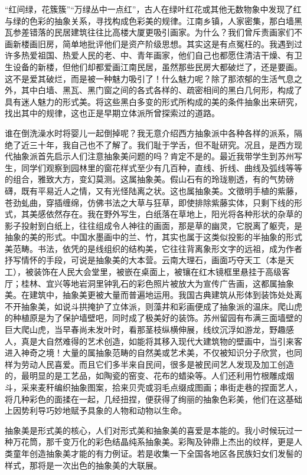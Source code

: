 \documentclass{article}
\begin{document}
“红间绿，花簇簇”“万绿丛中一点红”，古人在绿叶红花或其他无数物象中发现了红与绿的色彩的抽象关系，寻找构成色彩美的规律。江南乡镇，人家密集，那白墙黑瓦参差错落的民居建筑往往比高楼大厦更吸引画家。为什么？我们曾斥责画家们不画新楼画旧房，简单地批评他们是资产阶级思想。其实这是有点冤枉的。我遇到过许多热爱祖国、热爱人民的老、中、青年画家，他们自己也都愿住清洁干燥、有卫生设备的新楼，但他们却都爱画江南民居，虽然那些民房大都破烂了，还是要画。这不是爱其破烂，而是被一种魅力吸引了！什么魅力呢？除了那浓郁的生活气息之外，其中白墙、黑瓦、黑门窗之间的各式各样的、疏密相间的黑白几何形，构成了具有迷人魅力的形式美。将这些黑白多变的形式所构成的美的条件抽象出来研究，找出其中的规律，这也正是早期立体派所曾探索过的道路。

谁在倒洗澡水时将婴儿一起倒掉呢？我无意介绍西方抽象派中各种各样的派系，隔绝了近三十年，我自己也不了解了。我们耻于学舌，但不耻研究。况且，是西方现代抽象派首先启示人们注意抽象美问题的吗？肯定不是的。最近我带学生到苏州写生，同学们观察到园林里的窗花样式至少有几百种，直线、折线、曲线及弧线等等的组合，雅致大方，变幻莫测。这属抽象美。假山石有的玲珑剔透，有的气势磅礴，既有平易近人之情，又有光怪陆离之状。这也属抽象美。文徵明手植的紫藤，苍劲虬曲，穿插缠绵，仿佛书法之大草与狂草，即使排除紫藤实体，只剩下线的形式，其美感依然存在。我在野外写生，白纸落在草地上，阳光将各种形状的杂草的影子投射到白纸上，往往组成令人神往的画面，那是草的幽灵，它脱离了躯壳，是抽象的美的形式。中国水墨画中的兰、竹，其实也属于这类似投影的半抽象的形式美范畴。书法，依凭的是线组织的结构美，它往往背离象形文字的远祖，成为作者抒写情怀的手段，可说是抽象美的大本营。云南大理石，画面巧夺天工（本是天工），被装饰在人民大会堂里，被嵌在桌面上，被镶在红木镜框里悬挂于高级客厅；桂林、宜兴等地岩洞里钟乳石的彩色照片被放大为宣传广告画，这都属抽象美。在建筑中，抽象美更被大量而普遍地运用。我国古典建筑从形体到装饰处处离不开抽象美，如说斗拱掩护了立体派，则藻井和彩画便成了抽象派的温床。爬山虎的种植原是为了保护墙壁吧，同时成了极美好的装饰。苏州留园有布满三面墙壁的巨大爬山虎，当早春尚未发叶时，看那茎枝纵横伸展，线纹沉浮如游龙，野趣感人，真是大自然难得的艺术创造，如能将其移入现代大建筑物的壁画中，当引来客进入神奇之境！大量的属抽象范畴的自然美或艺术美，不仅被知识分子欣赏，也同样为劳动人民喜爱。而且它们多半来自民间，很多是被民间艺人发现及加工创造的，最明显的是工艺品，如陶瓷的窑变、花布的蜡染等。人们还利用竹根雕成烟斗，采来麦秆编织抽象图案，拾来贝壳或羽毛点缀成图画；串街走巷的捏面艺人，将几种彩色的面揉在一起，几经扭捏，便获得了绚丽的抽象色彩美，他们在这基础上因势利导巧妙地赋予具象的人物和动物以生命。

抽象美是形式美的核心，人们对形式美和抽象美的喜爱是本能的。我小时候玩过一种万花筒，那千变万化的彩色结晶纯系抽象美。彩陶及钟鼎上杰出的纹样，更是人类童年创造抽象美才能的有力例证。若是收集一下全国各地区各民族妇女们发髻的样式，那将是一次出色的抽象美的大联展。
\end{document}

